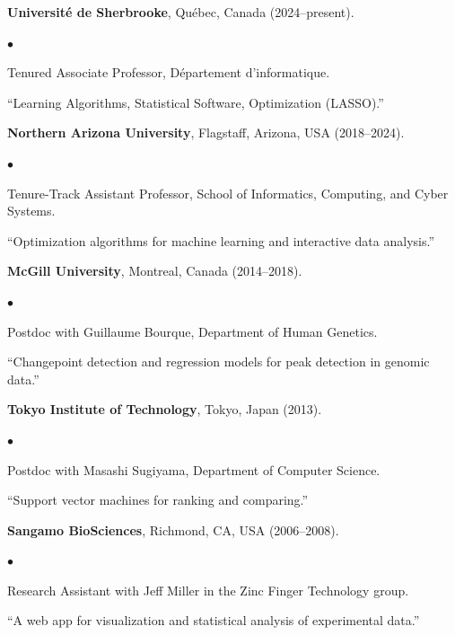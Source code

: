 \documentclass[margin,line]{res}
\newenvironment{list2}{
  \begin{list}{$\bullet$}{%
      \setlength{\itemsep}{0in}
      \setlength{\parsep}{0in} \setlength{\parskip}{0in}
      \setlength{\topsep}{0in} \setlength{\partopsep}{0in} 
      \setlength{\leftmargin}{0.2in}}}{\end{list}}
\begin{document}
\begin{resume}
{\bf Université de Sherbrooke}, Québec, Canada (2024--present).\\
\vspace*{-.1in}
\begin{list2}
\item[] Tenured Associate Professor, Département d'informatique.
\item[] ``Learning Algorithms, Statistical Software, Optimization (LASSO).''
\end{list2}

{\bf Northern Arizona University}, Flagstaff, Arizona, USA (2018--2024).\\
\vspace*{-.1in}
\begin{list2}
\item[] Tenure-Track Assistant Professor, School of Informatics, Computing, and Cyber Systems.
\item[] ``Optimization algorithms for machine learning and interactive data analysis.''
\end{list2}

{\bf McGill University}, Montreal, Canada (2014--2018).\\
\vspace*{-.1in}
\begin{list2}
\item[] Postdoc with Guillaume Bourque, Department of Human Genetics.
\item[]``Changepoint detection and regression models for peak detection in genomic data.''
\end{list2}

{\bf Tokyo Institute of Technology}, Tokyo, Japan (2013).\\
\vspace*{-.1in}
\begin{list2}
\item[] Postdoc with Masashi Sugiyama, Department of Computer Science.
\item[] ``Support vector machines for ranking and comparing.''
\end{list2}

{\bf Sangamo BioSciences}, Richmond, CA, USA (2006--2008).\\
\vspace*{-.1in}
\begin{list2}
\item[] Research Assistant with Jeff Miller in the Zinc Finger Technology group.
\item[] ``A web app for visualization and statistical analysis of experimental data.''
\end{list2}


\end{resume}
\end{document}
